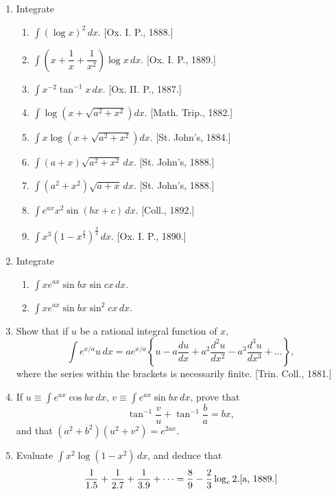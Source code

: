 \documentclass[11pt, a4paper]{article}
\newcommand{\source}[1]{\hfill\textnormal{[#1]}}
\begin{document}
\begin{enumerate}[leftmargin=2em]
\item Integrate
\begin{enumerate}[label=(\roman*)]
\item $\displaystyle\int (\log x)^2\,dx$. \source{Ox. I. P., 1888.}
\item $\displaystyle\int \left(x+\dfrac{1}{x}+\dfrac{1}{x^2}\right)\log x\,dx$. \source{Ox. I. P., 1889.}
\item $\displaystyle\int x^{-2}\tan^{-1}x\,dx$. \source{Ox. II. P., 1887.}
\item $\displaystyle\int \log\left(x+\sqrt{a^2+x^2}\right)dx$. \source{Math. Trip., 1882.}
\item $\displaystyle\int x\log\left(x+\sqrt{a^2+x^2}\right)dx$. \source{St. John's, 1884.}
\item $\displaystyle\int (a+x)\sqrt{a^2+x^2}\,dx$. \source{St. John's, 1888.}
\item $\displaystyle\int (a^2+x^2)\sqrt{a+x}\,dx$. \source{St. John's, 1888.}
\item $\displaystyle\int e^{ax}x^2\sin(bx+c)\,dx$. \source{Coll., 1892.}
\item $\displaystyle\int x^3(1-x^{\frac23})^{\frac32}\,dx$. \source{Ox. I. P., 1890.}
\end{enumerate}

\item Integrate
\begin{enumerate}[label=(\roman*)]
\item $\displaystyle\int xe^{ax}\sin bx\sin cx\,dx$.
\item $\displaystyle\int xe^{ax}\sin bx\sin^2cx\,dx$.
\end{enumerate}

\item Show that if $u$ be a rational integral function of $x$,
\[
\int e^{x/a}u\,dx = ae^{x/a}\left\{u-a\dfrac{du}{dx}+a^2\dfrac{d^2u}{dx^2}-a^3\dfrac{d^3u}{dx^3}+\dots\right\},
\]
where the series within the brackets is necessarily finite. \source{Trin. Coll., 1881.}

\item If $u\equiv\displaystyle\int e^{ax}\cos bx\,dx$, $v\equiv\displaystyle\int e^{ax}\sin bx\,dx$, prove that
\[
\tan^{-1}\dfrac{v}{u}+\tan^{-1}\dfrac{b}{a}=bx,
\]
and that $(a^2+b^2)(u^2+v^2)=e^{2ax}$.

\item Evaluate $\displaystyle\int x^2\log(1-x^2)\,dx$, and deduce that
\[
\dfrac{1}{1.5}+\dfrac{1}{2.7}+\dfrac{1}{3.9}+\dots = \dfrac{8}{9}-\dfrac{2}{3}\log_e 2. \source{a, 1889.}
\]


\end{enumerate}
\end{document}
